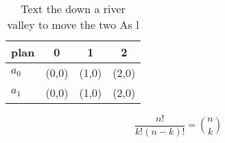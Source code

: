 \documentclass[a4paper]{article}
\begin{document}
\begin{table}
\begin{adjustbox}{width=0.6\columnwidth}
\begin{tabular}{|l|l|l|l|}
\hline
\textbf{plan} & \multicolumn{1}{c|}{\textbf{0}} & \multicolumn{1}{c|}{\textbf{1}} & \multicolumn{1}{c|}{\textbf{2}} \\ \hline
\textbf{$a_0$}  & (0,0) & (1,0) & (2,0) \\ \hline
\textbf{$a_1$}  & (0,0) & (1,0) & (2,0) \\ \hline
\end{tabular}
\end{adjustbox}
\caption{Text the down a river valley to move the two As l
}
\end{table}

\[ \frac{n!}{k!(n-k)!} = \binom{n}{k} \]
\end{document}
